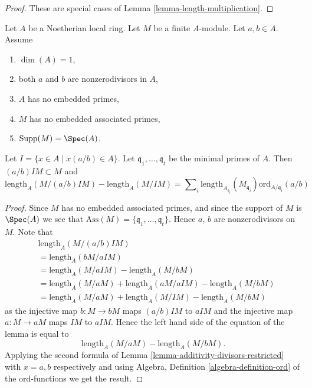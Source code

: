 \begin{proof}
These are special cases of Lemma \ref{lemma-length-multiplication}.
\end{proof}

\begin{lemma}
\label{lemma-no-embedded-points-modules}
Let $A$ be a Noetherian local ring.
Let $M$ be a finite $A$-module.
Let $a, b \in A$.
Assume
\begin{enumerate}
\item $\dim(A) = 1$,
\item both $a$ and $b$ are nonzerodivisors in $A$,
\item $A$ has no embedded primes,
\item $M$ has no embedded associated primes,
\item $\text{Supp}(M) = \Spec(A)$.
\end{enumerate}
Let $I = \{x \in A \mid x(a/b) \in A\}$.
Let $\mathfrak q_1, \ldots, \mathfrak q_t$ be the minimal
primes of $A$. Then $(a/b)IM \subset M$ and
$$
\text{length}_A(M/(a/b)IM)
-
\text{length}_A(M/IM)
=
\sum\nolimits_i
\text{length}_{A_{\mathfrak q_i}}(M_{\mathfrak q_i})
\text{ord}_{A/\mathfrak q_i}(a/b)
$$
\end{lemma}

\begin{proof}
Since $M$ has no embedded associated primes, and since
the support of $M$ is $\Spec(A)$ we see that
$\text{Ass}(M) = \{\mathfrak q_1, \ldots, \mathfrak q_t\}$.
Hence $a$, $b$ are nonzerodivisors on $M$. Note that
\begin{align*}
& \text{length}_A(M/(a/b)IM) \\
& = \text{length}_A(bM/aIM) \\
& = \text{length}_A(M/aIM)
-
\text{length}_A(M/bM) \\
& = \text{length}_A(M/aM) + \text{length}_A(aM/aIM) - \text{length}_A(M/bM) \\
& = \text{length}_A(M/aM) + \text{length}_A(M/IM) - \text{length}_A(M/bM)
\end{align*}
as the injective map $b : M \to bM$ maps $(a/b)IM$ to $aIM$
and the injective map $a : M \to aM$ maps $IM$ to $aIM$.
Hence the left hand side of the equation of the lemma is
equal to
$$
\text{length}_A(M/aM) - \text{length}_A(M/bM).
$$
Applying the second formula of
Lemma \ref{lemma-additivity-divisors-restricted} with $x = a, b$ respectively
and using Algebra, Definition \ref{algebra-definition-ord}
of the $\text{ord}$-functions we get the result.
\end{proof}











